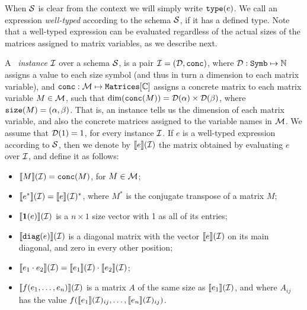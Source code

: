 \medskip

When $\mathcal{S}$ is clear from the context we will simply write $\texttt{type}(e)$. We call an expression {\em well-typed} according to the schema $\mathcal{S}$, if it has a defined type. Note that a well-typed expression can be evaluated regardless of the actual sizes of the matrices assigned to matrix variables, as we describe next.

A \lang\ {\em instance} $\mathcal{I}$ over a schema $\mathcal{S}$, is a pair $\mathcal{I} = (\mathcal{D},\texttt{conc})$, where $\mathcal{D} : \texttt{Symb} \mapsto \mathbb{N}$ assigns a value to each size symbol (and thus in turn a dimension to each matrix variable), and $\texttt{conc} : \mathcal{M} \mapsto \texttt{Matrices}[\mathbb{C}]$ assigns a concrete matrix to each matrix variable $M\in \mathcal{M}$, such that $\dim(\texttt{conc}(M)) = \mathcal{D}(\alpha)\times \mathcal{D}(\beta)$, where $\texttt{size}(M) = (\alpha,\beta)$. That is, an instance tells us the dimension of each matrix variable, and also the concrete matrices assigned to the variable names in $\mathcal{M}$. We assume that $\mathcal{D}(1) = 1$, for every instance $\mathcal{I}$. If $e$ is a well-typed expression according to $\mathcal{S}$, then we denote by $\llbracket e \rrbracket(\mathcal{I})$ the matrix obtained by evaluating $e$ over $\mathcal{I}$, and define it as follows:
\begin{itemize}
\item $\llbracket M \rrbracket(\mathcal{I}) = \texttt{conc}(M)$, for $M\in \mathcal{M}$;
\item $\llbracket e^* \rrbracket(\mathcal{I}) = \llbracket e \rrbracket(\mathcal{I})^*$, where $M^*$ is the conjugate transpose of a matrix $M$;
\item $\llbracket \mathbf{1}(e) \rrbracket(\mathcal{I})$ is a $n\times 1$ size vector with 1 as all of its entries;
\item $\llbracket \texttt{diag}(e) \rrbracket(\mathcal{I})$ is a diagonal matrix with the vector $\llbracket e \rrbracket(\mathcal{I})$ on its main diagonal, and zero in every other position;
\item $\llbracket e_1\cdot e_2 \rrbracket(\mathcal{I}) = \llbracket e_1 \rrbracket(\mathcal{I}) \cdot \llbracket e_2 \rrbracket(\mathcal{I})$;
\item $\llbracket f(e_1,\ldots ,e_n) \rrbracket(\mathcal{I})$ is a matrix $A$ of the same size as $\llbracket e_1 \rrbracket(\mathcal{I})$, and where $A_{ij}$ has the value $f(\llbracket e_1 \rrbracket(\mathcal{I})_{ij},\ldots ,\llbracket e_n \rrbracket(\mathcal{I})_{ij})$.
\end{itemize}